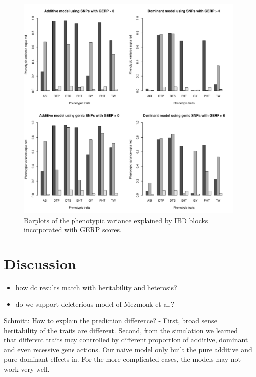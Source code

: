 \documentclass[9pt,twocolumn,twoside]{gsajnl}
\begin{document}
\begin{figure}[htbp]
\centering
\includegraphics[width=\linewidth]{Figure_h2.pdf}
\caption{Barplots of the phenotypic variance explained by IBD blocks incorporated with GERP scores.}
\label{fig:h2}
\end{figure}


\section*{Discussion}

\begin{itemize}
  \item how do results match with heritability and heterosis?
  \item do we support deleterious model of Mezmouk et al.?
\end{itemize}

Schmitt: How to explain the prediction difference?  
- First, broad sense heritability of the traits are different. Second, from the simulation we learned that different traits may controlled by different proportion of additive, dominant and even recessive gene actions. Our naive model only built the pure additive and pure dominant effects in. For the more complicated cases, the models may not work very well.
\end{document}
